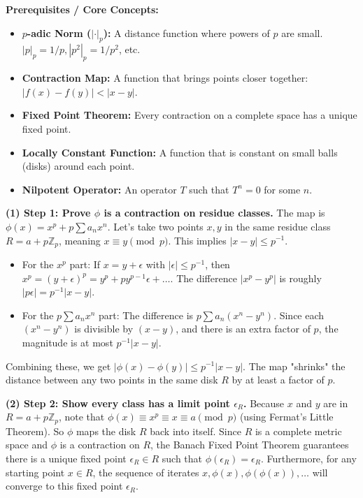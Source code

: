 \begin{solution}
\textbf{Prerequisites / Core Concepts:}
\begin{itemize}
    \item \textbf{$p$-adic Norm ($|\cdot|_p$):} A distance function where powers of $p$ are small. $|p|_p = 1/p, |p^2|_p = 1/p^2$, etc.
    \item \textbf{Contraction Map:} A function that brings points closer together: $|f(x) - f(y)| < |x - y|$.
    \item \textbf{Fixed Point Theorem:} Every contraction on a complete space has a unique fixed point.
    \item \textbf{Locally Constant Function:} A function that is constant on small balls (disks) around each point.
    \item \textbf{Nilpotent Operator:} An operator $T$ such that $T^n = 0$ for some $n$.
\end{itemize}

\textbf{(1) Step 1: Prove $\phi$ is a contraction on residue classes.}
The map is $\phi(x) = x^p + p \sum a_n x^n$. Let's take two points $x, y$ in the same residue class $R = a + p\mathbb{Z}_p$, meaning $x \equiv y \pmod p$. This implies $|x - y| \leq p^{-1}$.
\begin{itemize}
    \item For the $x^p$ part: If $x = y + \epsilon$ with $|\epsilon| \leq p^{-1}$, then $x^p = (y+\epsilon)^p = y^p + py^{p-1}\epsilon + \dots$.
    The difference $|x^p - y^p|$ is roughly $|p \epsilon| = p^{-1} |x - y|$.
    \item For the $p \sum a_n x^n$ part: The difference is $p \sum a_n (x^n - y^n)$. Since each $(x^n - y^n)$ is divisible by $(x-y)$, and there is an extra factor of $p$, the magnitude is at most $p^{-1} |x - y|$.
\end{itemize}
Combining these, we get $|\phi(x) - \phi(y)| \leq p^{-1} |x - y|$. The map "shrinks" the distance between any two points in the same disk $R$ by at least a factor of $p$.

\textbf{(2) Step 2: Show every class has a limit point $\epsilon_R$.}
Because $x$ and $y$ are in $R = a + p\mathbb{Z}_p$, note that $\phi(x) \equiv x^p \equiv x \equiv a \pmod p$ (using Fermat's Little Theorem). So $\phi$ maps the disk $R$ back into itself.
Since $R$ is a complete metric space and $\phi$ is a contraction on $R$, the Banach Fixed Point Theorem guarantees there is a unique fixed point $\epsilon_R \in R$ such that $\phi(\epsilon_R) = \epsilon_R$.
Furthermore, for any starting point $x \in R$, the sequence of iterates $x, \phi(x), \phi(\phi(x)), \dots$ will converge to this fixed point $\epsilon_R$.


\end{solution}
